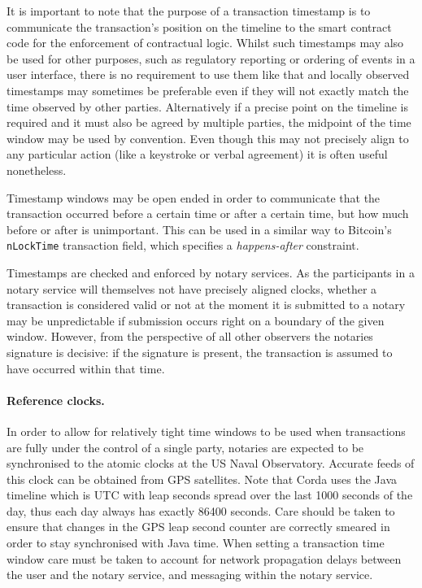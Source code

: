 \documentclass{article}
\begin{document}
It is important to note that the purpose of a transaction timestamp is to communicate the transaction's position
on the timeline to the smart contract code for the enforcement of contractual logic. Whilst such timestamps may
also be used for other purposes, such as regulatory reporting or ordering of events in a user interface, there is
no requirement to use them like that and locally observed timestamps may sometimes be preferable even if they will
not exactly match the time observed by other parties. Alternatively if a precise point on the timeline is required
and it must also be agreed by multiple parties, the midpoint of the time window may be used by convention. Even
though this may not precisely align to any particular action (like a keystroke or verbal agreement) it is often
useful nonetheless.

Timestamp windows may be open ended in order to communicate that the transaction occurred before a certain
time or after a certain time, but how much before or after is unimportant. This can be used in a similar
way to Bitcoin's \texttt{nLockTime} transaction field, which specifies a \emph{happens-after} constraint.

Timestamps are checked and enforced by notary services. As the participants in a notary service will themselves
not have precisely aligned clocks, whether a transaction is considered valid or not at the moment it is submitted
to a notary may be unpredictable if submission occurs right on a boundary of the given window. However, from the
perspective of all other observers the notaries signature is decisive: if the signature is present, the transaction
is assumed to have occurred within that time.

\paragraph{Reference clocks.}In order to allow for relatively tight time windows to be used when transactions are fully
under the control of a single party, notaries are expected to be synchronised to the atomic clocks at the US Naval
Observatory. Accurate feeds of this clock can be obtained from GPS satellites. Note that Corda uses the Java
timeline\cite{JavaTimeScale} which is UTC with leap seconds spread over the last 1000 seconds of the day, thus each day
always has exactly 86400 seconds. Care should be taken to ensure that changes in the GPS leap second counter are
correctly smeared in order to stay synchronised with Java time. When setting a transaction time window care must be
taken to account for network propagation delays between the user and the notary service, and messaging within the notary
service.
\end{document}
